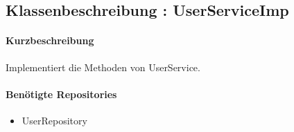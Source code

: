 \subsection*{Klassenbeschreibung : UserServiceImp}%
\paragraph*{Kurzbeschreibung}
Implementiert die Methoden von UserService.
\paragraph*{Benötigte Repositories}
\begin{itemize}
    \item UserRepository
\end{itemize}